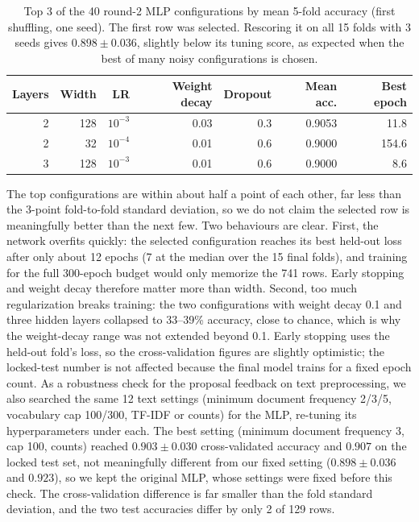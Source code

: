 \documentclass[12pt]{article}
\begin{document}
\begin{table}[ht]
\centering
\small
\begin{tabular}{@{}rrrrrrr@{}}
\toprule
Layers & Width & LR & Weight decay & Dropout & Mean acc. & Best epoch \\
\midrule
2 & 128 & $10^{-3}$ & 0.03 & 0.3 & 0.9053 & 11.8 \\
2 & 32 & $10^{-4}$ & 0.01 & 0.6 & 0.9000 & 154.6 \\
3 & 128 & $10^{-3}$ & 0.01 & 0.6 & 0.9000 & 8.6 \\
\bottomrule
\end{tabular}
\caption{Top 3 of the 40 round-2 MLP configurations by mean 5-fold accuracy (first shuffling, one
seed). The first row was selected. Rescoring it on all 15 folds with 3 seeds gives
$0.898\pm0.036$, slightly below its tuning score, as expected when the best of many noisy
configurations is chosen.}
\label{tab:mlp-grid}
\end{table}

The top configurations are within about half a point of each other, far less than the 3-point
fold-to-fold standard deviation, so we do not claim the selected row is meaningfully better than
the next few. Two behaviours are clear. First, the network overfits quickly: the selected
configuration reaches its best held-out loss after only about 12 epochs (7 at the median over the 15
final folds), and training for the full 300-epoch budget would only memorize the 741 rows. Early stopping
and weight decay therefore matter more than width. Second, too much regularization breaks training:
the two configurations with weight decay 0.1 and three hidden layers collapsed to 33--39\% accuracy,
close to chance, which is why the weight-decay range was not extended beyond 0.1. Early stopping
uses the held-out fold's loss, so the cross-validation figures are slightly optimistic; the locked-test
number is not affected because the final model trains for a fixed epoch count. As a robustness check for 
the proposal feedback on text preprocessing, we also searched the same 12 text settings (minimum document 
frequency 2/3/5, vocabulary cap 100/300, TF-IDF or counts) for the MLP, re-tuning its hyperparameters 
under each. The best setting (minimum document frequency 3, cap 100, counts) reached $0.903 \pm 0.030$ 
cross-validated accuracy and $0.907$ on the locked test set, not meaningfully different from our fixed 
setting ($0.898 \pm 0.036$ and $0.923$), so we kept the original MLP, whose settings were fixed before
this check. The cross-validation difference is far smaller than the fold standard deviation, and the 
two test accuracies differ by only 2 of 129 rows.
\end{document}
